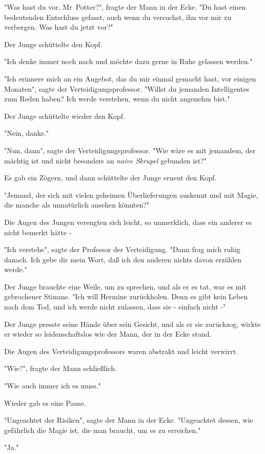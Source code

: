 {"Was hast du vor, Mr~Potter?", fragte der Mann in der Ecke. "Du hast einen bedeutenden Entschluss gefasst, auch wenn du versuchst, ihn vor mir zu verbergen. Was hast du jetzt vor?"

Der Junge schüttelte den Kopf.

"Ich denke immer noch nach und möchte dazu gerne in Ruhe gelassen werden."

"Ich erinnere mich an ein Angebot, das du mir einmal gemacht hast, vor einigen Monaten", sagte der Verteidigungsprofessor. "Willst du jemanden Intelligentes zum Reden haben? Ich werde verstehen, wenn du nicht angenehm bist."

Der Junge schüttelte wieder den Kopf.

"Nein, danke."

"Nun, dann", sagte der Verteidigungsprofessor. "Wie wäre es mit jemandem, der mächtig ist und nicht besonders an \emph{naive Skrupel} gebunden ist?"

Es gab ein Zögern, und dann schüttelte der Junge erneut den Kopf.

"Jemand, der sich mit vielen geheimen Überlieferungen auskennt und mit Magie, die manche als unnatürlich ansehen könnten?"

Die Augen des Jungen verengten sich leicht, so unmerklich, dass ein anderer es nicht bemerkt hätte -

"Ich verstehe", sagte der Professor der Verteidigung. "Dann frag mich ruhig danach. Ich gebe dir mein Wort, daß ich den anderen nichts davon erzählen werde."

Der Junge brauchte eine Weile, um zu sprechen, und als er es tat, war es mit gebrochener Stimme. "Ich will Hermine zurückholen. Denn es gibt kein Leben nach dem Tod, und ich werde nicht zulassen, dass sie - einfach nicht -"

Der Junge presste seine Hände über sein Gesicht, und als er sie zurückzog, wirkte er wieder so leidenschaftslos wie der Mann, der in der Ecke stand.

Die Augen des Verteidigungsprofessors waren abstrakt und leicht verwirrt.

"Wie?", fragte der Mann schließlich.

"Wie auch immer ich es muss."

Wieder gab es eine Pause.

"Ungeachtet der Risiken", sagte der Mann in der Ecke. "Ungeachtet dessen, wie gefährlich die Magie ist, die man braucht, um es zu erreichen."

"Ja."

}
